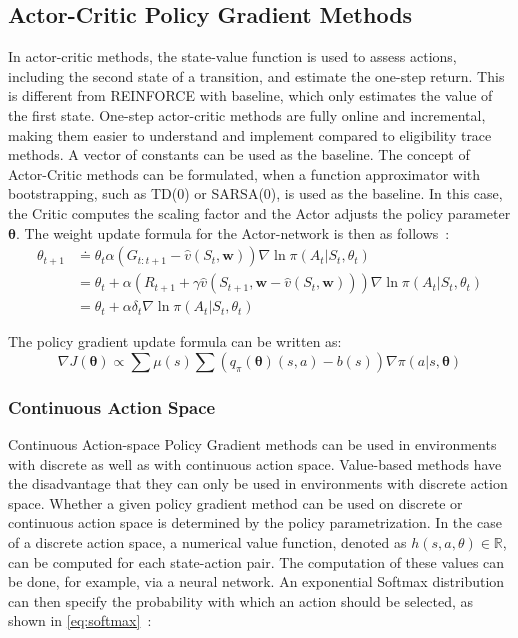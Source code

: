 \documentclass[../xlapes02]{subfiles}
\begin{document}
    \subsection{Actor-Critic Policy Gradient Methods}\label{subsec:actor-critic-policy-gradient-methods}
    In actor-critic methods, the state-value function is used to assess actions, including the second state of a transition, and estimate the one-step return. This is different from REINFORCE with baseline, which only estimates the value of the first state. One-step actor-critic methods are fully online and incremental, making them easier to understand and implement compared to eligibility trace methods. A vector of constants can be used as the baseline. The concept of Actor-Critic methods can be formulated, when a function approximator with bootstrapping, such as TD(0) or SARSA(0), is used as the baseline. In this case, the Critic computes the scaling factor and the Actor adjusts the policy parameter $\bm{\theta}$. The weight update formula for the Actor-network is then as follows~\cite{sutton2018reinforcement, FITMT25127}:
    \begin{equation}
        \begin{split}
            \theta_{t+1}&\doteq\theta_t\alpha\left(G_{t:t+1}-\hat{v}(S_t,\bm{w})\right)\nabla\ln\pi(A_t|S_t,\theta_t)\\
            &=\theta_t+\alpha\left(R_{t+1}+\gamma\hat{v}(S_{t+1},\bm{w}-\hat{v}(S_t,\bm{w}))\right)\nabla\ln\pi(A_t|S_t,\theta_t)\\
            &=\theta_t+\alpha\delta_t\nabla\ln\pi(A_t|S_t,\theta_t)
        \end{split}
    \end{equation}

    The policy gradient update formula can be written as:
    \begin{equation}
        \nabla J(\bm{\theta})\propto\sum\mu(s)\sum(q_\pi(\bm{\theta})(s,a)-b(s))\nabla\pi(a|s,\bm{\theta})
    \end{equation}

    \subsubsection{Continuous Action Space}
    Continuous Action-space Policy Gradient methods can be used in environments with discrete as well as with continuous action space. Value-based methods have the disadvantage that they can only be used in environments with discrete action space. Whether a given policy gradient method can be used on discrete or continuous action space is determined by the policy parametrization. In the case of a discrete action space, a numerical value function, denoted as $ h(s, a, \theta) \in \mathbb{R} $, can be computed for each state-action pair. The computation of these values can be done, for example, via a neural network. An exponential Softmax distribution can then specify the probability with which an action should be selected, as shown in \cref{eq:softmax}~\cite{FITMT25127, sutton2018reinforcement}:
\end{document}
